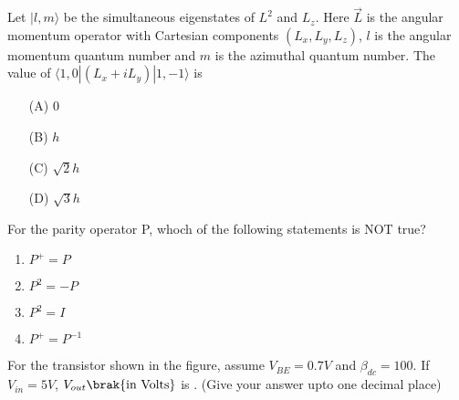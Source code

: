 \item Let \( |l, m \rangle \) be the simultaneous eigenstates of \( L^2 \) and \( L_z \). Here \( \vec{L} \) is the angular momentum operator with Cartesian components \( (L_x, L_y, L_z) \), \( l \) is the angular momentum quantum number and \( m \) is the azimuthal quantum number. The value of \( \langle 1, 0 | (L_x + iL_y) | 1, -1 \rangle \) is
\begin{multicols}{2}
\begin{enumerate}
    \item[(A)] $0$
    \item[(B)] $h$
    \item[(C)] $\sqrt{2}h$
    \item[(D)] $\sqrt{3}h$
\end{enumerate}
\end{multicols}

\vspace{0.5cm}

\item For the parity operator P, whoch of the following statements is NOT true?
\begin{multicols}{2}
    \begin{enumerate}
        \item $P^+=P$
        \item $P^2=-P$
        \item $P^2=I$
        \item $P^+=P^{-1}$
    \end{enumerate}
\end{multicols}
\vspace{0.5cm}

\item For the transistor shown in the figure, assume $V_{BE}=0.7V$ and $\beta_{dc}=100$. If $V_{in}=5V$, $V_{out}\brak{\text{in Volts}}$ is \underline{\hspace{2cm}}. (Give your answer upto one decimal place)

